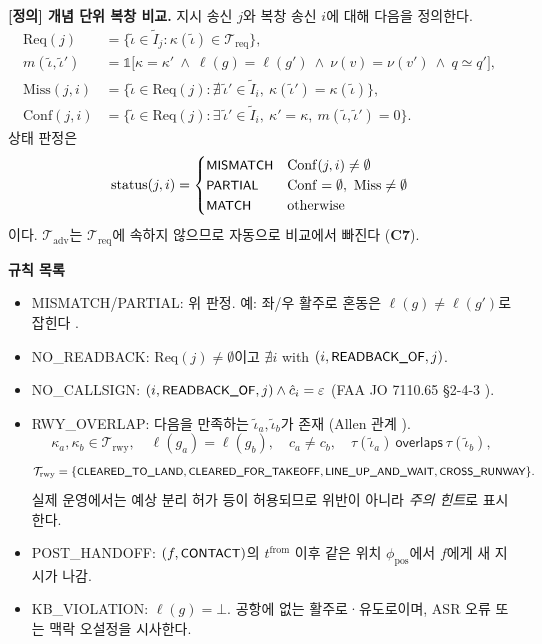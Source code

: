 \documentclass[10pt,a4paper]{article}
\newcommand{\Treq}{\mathcal{T}_{\mathrm{req}}}
\newcommand{\Tadv}{\mathcal{T}_{\mathrm{adv}}}
\newcommand{\cmd}[1]{\textsf{\small #1}}
\newcommand{\ch}[1]{\textbf{\textcolor{red!60!black}{#1}}}
\begin{document}
\textbf{[정의] 개념 단위 복창 비교.} 지시 송신 $j$와 복창 송신 $i$에 대해 다음을 정의한다.
\begin{align}
\mathrm{Req}(j) &= \{\tilde\iota\in\tilde I_j : \kappa(\tilde\iota)\in\Treq\},\\
m(\tilde\iota,\tilde\iota') &= \mathbb{1}\big[\kappa=\kappa'\ \wedge\ \ell(g)=\ell(g')\ \wedge\ \nu(v)=\nu(v')\ \wedge\ q\simeq q'\big],\\
\mathrm{Miss}(j,i) &= \{\tilde\iota\in\mathrm{Req}(j) : \nexists\,\tilde\iota'\in\tilde I_i,\ \kappa(\tilde\iota')=\kappa(\tilde\iota)\},\\
\mathrm{Conf}(j,i) &= \{\tilde\iota\in\mathrm{Req}(j) : \exists\,\tilde\iota'\in\tilde I_i,\ \kappa'=\kappa,\ m(\tilde\iota,\tilde\iota')=0\}.
\end{align}
상태 판정은
\begin{equation}
\mathrm{status}(j,i)=\begin{cases}
\cmd{MISMATCH} & \mathrm{Conf}(j,i)\neq\emptyset\\
\cmd{PARTIAL} & \mathrm{Conf}=\emptyset,\ \mathrm{Miss}\neq\emptyset\\
\cmd{MATCH} & \text{otherwise}
\end{cases}
\end{equation}
이다. $\Tadv$는 $\Treq$에 속하지 않으므로 자동으로 비교에서 빠진다 (\ch{C7}).

\textbf{규칙 목록}
\begin{itemize}
\item[$\rho_1$] \cmd{MISMATCH}/\cmd{PARTIAL}: 위 판정. 예: 좌/우 활주로 혼동은 $\ell(g)\neq\ell(g')$로 잡힌다 \cite{cardosi94}.
\item[$\rho_2$] \cmd{NO\_READBACK}: $\mathrm{Req}(j)\neq\emptyset$이고 $\nexists i$ with $(i,\cmd{READBACK\_OF},j)$.
\item[$\rho_3$] \cmd{NO\_CALLSIGN}: $(i,\cmd{READBACK\_OF},j)\wedge \hat c_i=\varepsilon$ (FAA JO 7110.65 §2-4-3 \cite{faa7110}).
\item[$\rho_4$] \cmd{RWY\_OVERLAP}: 다음을 만족하는 $\tilde\iota_a,\tilde\iota_b$가 존재 (Allen 관계 \cite{allen1983}).
\[\kappa_a,\kappa_b\in\mathcal{T}_{\mathrm{rwy}},\quad \ell(g_a)=\ell(g_b),\quad c_a\neq c_b,\quad \tau(\tilde\iota_a)\ \mathsf{overlaps}\ \tau(\tilde\iota_b),\]
\[\mathcal{T}_{\mathrm{rwy}}=\{\cmd{CLEARED\_TO\_LAND},\cmd{CLEARED\_FOR\_TAKEOFF},\cmd{LINE\_UP\_AND\_WAIT},\cmd{CROSS\_RUNWAY}\}.\] 실제 운영에서는 예상 분리 허가 등이 허용되므로 위반이 아니라 \emph{주의 힌트}로 표시한다.
\item[$\rho_5$] \cmd{POST\_HANDOFF}: $(f,\cmd{CONTACT})$의 $t^{\mathrm{from}}$ 이후 같은 위치 $\phi_{\mathrm{pos}}$에서 $f$에게 새 지시가 나감.
\item[$\rho_6$] \cmd{KB\_VIOLATION}: $\ell(g)=\bot$. 공항에 없는 활주로·유도로이며, ASR 오류 또는 맥락 오설정을 시사한다.
\end{itemize}
\end{document}
